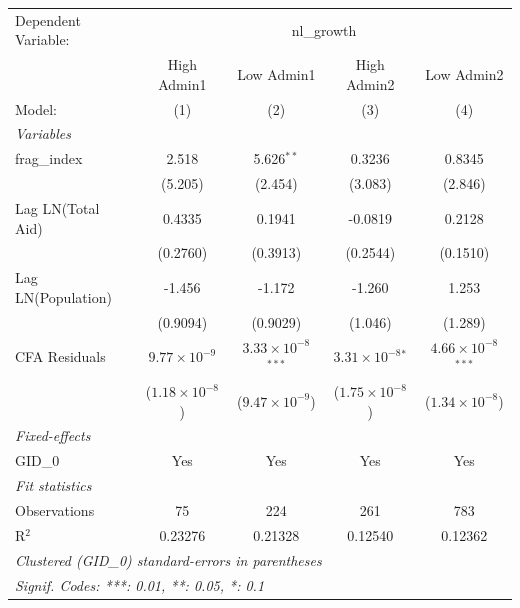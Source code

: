 
\begingroup
\centering
\begin{tabular}{lcccc}
   \tabularnewline \midrule \midrule
   Dependent Variable: & \multicolumn{4}{c}{nl\_growth}\\
                      & High Admin1             & Low Admin1                    & High Admin2                 & Low Admin2 \\   
   Model:             & (1)                     & (2)                           & (3)                         & (4)\\  
   \midrule
   \emph{Variables}\\
   frag\_index        & 2.518                   & 5.626$^{**}$                  & 0.3236                      & 0.8345\\   
                      & (5.205)                 & (2.454)                       & (3.083)                     & (2.846)\\   
   Lag LN(Total Aid)  & 0.4335                  & 0.1941                        & -0.0819                     & 0.2128\\   
                      & (0.2760)                & (0.3913)                      & (0.2544)                    & (0.1510)\\   
   Lag LN(Population) & -1.456                  & -1.172                        & -1.260                      & 1.253\\   
                      & (0.9094)                & (0.9029)                      & (1.046)                     & (1.289)\\   
   CFA Residuals      & $9.77\times 10^{-9}$    & $3.33\times 10^{-8}$$^{***}$  & $3.31\times 10^{-8}$$^{*}$  & $4.66\times 10^{-8}$$^{***}$\\    
                      & ($1.18\times 10^{-8}$)  & ($9.47\times 10^{-9}$)        & ($1.75\times 10^{-8}$)      & ($1.34\times 10^{-8}$)\\    
   \midrule
   \emph{Fixed-effects}\\
   GID\_0             & Yes                     & Yes                           & Yes                         & Yes\\  
   \midrule
   \emph{Fit statistics}\\
   Observations       & 75                      & 224                           & 261                         & 783\\  
   R$^2$              & 0.23276                 & 0.21328                       & 0.12540                     & 0.12362\\  
   \midrule \midrule
   \multicolumn{5}{l}{\emph{Clustered (GID\_0) standard-errors in parentheses}}\\
   \multicolumn{5}{l}{\emph{Signif. Codes: ***: 0.01, **: 0.05, *: 0.1}}\\
\end{tabular}
\par\endgroup


